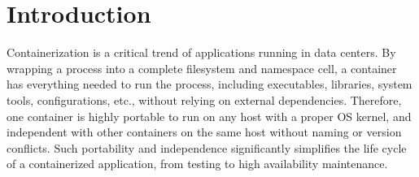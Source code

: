 \section{Introduction} \label{sec:introduction}


Containerization is a critical trend of applications running in data centers.
By wrapping a process into a complete filesystem and namespace cell, a container
has everything needed to run the process, including executables, libraries, system
tools, configurations, etc., without relying on external dependencies. 
Therefore, one container
is highly portable to run on any host with a proper OS kernel, and independent
with other containers on the same host without naming or version conflicts.
Such portability and independence significantly simplifies the life cycle of
a containerized application, from testing to high availability maintenance.


